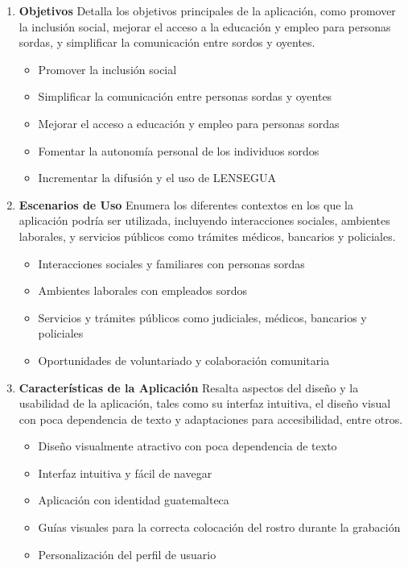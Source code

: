 \begin{enumerate}
    \item \textbf{Objetivos} 
    Detalla los objetivos principales de la aplicación, como promover la inclusión social, mejorar el acceso a la educación y empleo para personas sordas, y simplificar la comunicación entre sordos y oyentes.
    \begin{itemize}
        \item Promover la inclusión social
        \item Simplificar la comunicación entre personas sordas y oyentes
        \item Mejorar el acceso a educación y empleo para personas sordas
        \item Fomentar la autonomía personal de los individuos sordos
        \item Incrementar la difusión y el uso de LENSEGUA
    \end{itemize}
    
    \item \textbf{Escenarios de Uso} 
    Enumera los diferentes contextos en los que la aplicación podría ser utilizada, incluyendo interacciones sociales, ambientes laborales, y servicios públicos como trámites médicos, bancarios y policiales.
    \begin{itemize}
        \item Interacciones sociales y familiares con personas sordas
        \item Ambientes laborales con empleados sordos
        \item Servicios y trámites públicos como judiciales, médicos, bancarios y policiales
        \item Oportunidades de voluntariado y colaboración comunitaria
    \end{itemize}
    
    \item \textbf{Características de la Aplicación} 
    Resalta aspectos del diseño y la usabilidad de la aplicación, tales como su interfaz intuitiva, el diseño visual con poca dependencia de texto y adaptaciones para accesibilidad, entre otros.
    \begin{itemize}
        \item Diseño visualmente atractivo con poca dependencia de texto
        \item Interfaz intuitiva y fácil de navegar
        \item Aplicación con identidad guatemalteca
        \item Guías visuales para la correcta colocación del rostro durante la grabación
        \item Personalización del perfil de usuario
    \end{itemize}
\end{enumerate}


